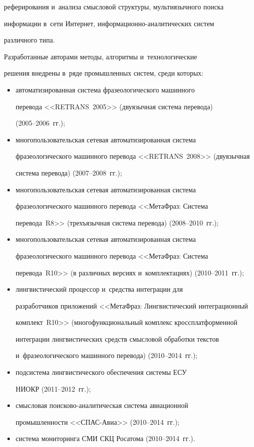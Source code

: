 реферирования и~анализа смысловой структуры, мультиязычного поиска 


информации в~сети Интернет, ин\-фор\-ма\-ци\-он\-но-ана\-ли\-ти\-че\-ских сис\-тем 


различного типа.


     


     Разработанные авторами методы, алгоритмы и~технологические 


решения внедрены в~ряде промышленных систем, среди которых:


     \begin{itemize}


     \item  автоматизированная система фразеологического машинного 


перевода <<\mbox{RETRANS~2005}>> (двуязычная система перевода)  


(2005--2006~гг.);


     \item многопользовательская сетевая автоматизированная сис\-те\-ма 


фразеологического машинного перевода <<RETRANS~2008>> (двуязычная 


система перевода) (2007--2008~гг.);


     \item  многопользовательская сетевая автоматизированная сис\-те\-ма 


фразеологического машинного перевода <<МетаФраз: Система 


перевода~R8>> (трехъязычная система перевода) (2008--2010~гг.);


     \item  многопользовательская сетевая автоматизированная сис\-те\-ма 


фразеологического машинного перевода <<МетаФраз: Система 


перевода~R10>> (в различных версиях и~комплектациях) (2010--2011~гг.);


     \item  лингвистический процессор и~средства интеграции для 


разработчиков приложений <<МетаФраз: Лингвистический интеграционный 


комплект~R10>> (многофункциональный комплекс  кроссплатформенной 


интеграции лингвистических средств смысловой обработки текстов 


и~фразеологического машинного перевода) (2010--2014~гг.);


     \item  подсистема лингвистического обеспечения системы ЕСУ 


НИОКР (2011--2012~гг.);


     \item  смысловая поисково-ана\-ли\-ти\-че\-ская сис\-те\-ма авиационной 


промышленности <<СПАС-Авиа>> (2010--2014~гг.);


     \item  система мониторинга СМИ СКЦ Росатома (2010--2014~гг.).


     \end{itemize}
